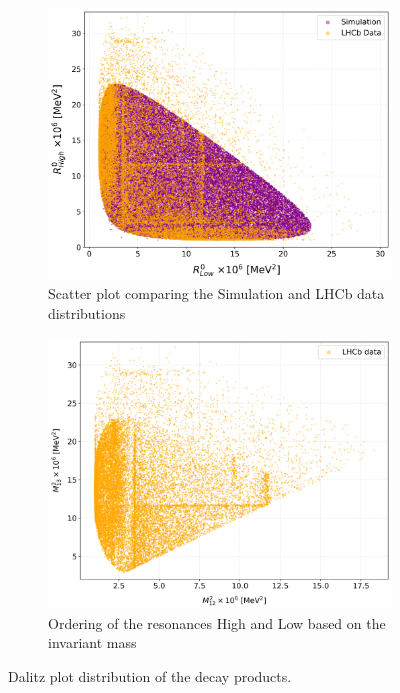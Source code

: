     
    \begin{figure}[H]
        \centering
        \begin{subfigure}[b]{0.48\textwidth}
            \centering
            \includegraphics[width=\textwidth, scale=0.35]{Figure/dalitz_data_sim.png}
            \caption{Scatter plot comparing the Simulation and LHCb data distributions}
        \end{subfigure}
        \hfill
        \begin{subfigure}[b]{0.48\textwidth}
            \centering
            \includegraphics[width=\textwidth, scale=0.35]{Figure/dalitz_data_ordering.png}
           \caption{Ordering of the resonances High and Low based on the invariant mass}
        \end{subfigure}
        \caption{Dalitz plot distribution of the decay products.}
        \label{dalitz_data}
    \end{figure}
    \\

